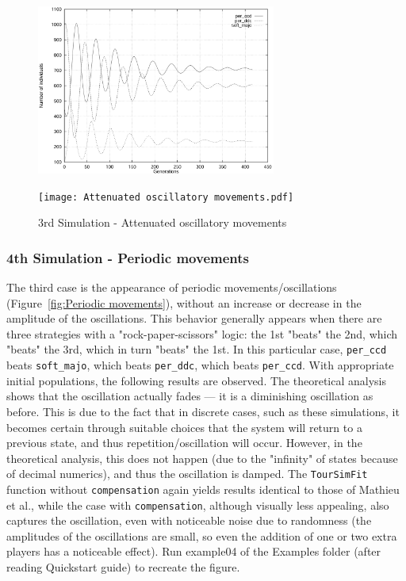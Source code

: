 	\begin{figure}[h]
	    \centering
		\includegraphics[width=0.7\textwidth]{RefPaperFigures/fig3.jpeg}\par\vspace{0.5em}
	    \texttt{[image: Attenuated oscillatory movements.pdf]}
	    \caption{3rd Simulation - Attenuated oscillatory movements}
	    \label{fig:Attenuated oscillatory movements}
	\end{figure}
\subsubsection{4th Simulation - Periodic movements}
The third case is the appearance of periodic movements/oscillations (Figure~\ref{fig:Periodic movements}), without an increase or decrease in the amplitude of the oscillations. This behavior generally appears when there are three strategies with a "rock-paper-scissors" logic: the 1st "beats" the 2nd, which "beats" the 3rd, which in turn "beats" the 1st. In this particular case, \texttt{per\_ccd} beats \texttt{soft\_majo}, which beats \texttt{per\_ddc}, which beats \texttt{per\_ccd}. With appropriate initial populations, the following results are observed. The theoretical analysis shows that the oscillation actually fades — it is a diminishing oscillation as before. This is due to the fact that in discrete cases, such as these simulations, it becomes certain through suitable choices that the system will return to a previous state, and thus repetition/oscillation will occur. However, in the theoretical analysis, this does not happen (due to the "infinity" of states because of decimal numerics), and thus the oscillation is damped. The \texttt{TourSimFit} function without \texttt{compensation} again yields results identical to those of Mathieu et al., while the case with \texttt{compensation}, although visually less appealing, also captures the oscillation, even with noticeable noise due to randomness (the amplitudes of the oscillations are small, so even the addition of one or two extra players has a noticeable effect). Run example04 of the Examples folder (after reading Quickstart guide) to recreate the figure.

